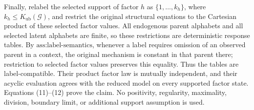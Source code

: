 Finally, relabel the selected support of factor \(h\) as \(\{1,\ldots,k_h\}\), where \(k_h\leq K_{\mathrm{ub}}(\mathcal G)\), and restrict the original structural equations to the Cartesian product of these selected factor values.  All endogenous parent alphabets and all selected latent alphabets are finite, so these restrictions are deterministic response tables.  By \(\text{ass:label-semantics}\), whenever a label requires omission of an observed parent in a context, the original mechanism is constant in that parent there; restriction to selected factor values preserves this equality.  Thus the tables are label-compatible.  Their product factor law is mutually independent, and their acyclic evaluation agrees with the reduced model on every supported factor state.  Equations (11)--(12) prove the claim.  No positivity, regularity, maximality, division, boundary limit, or additional support assumption is used.